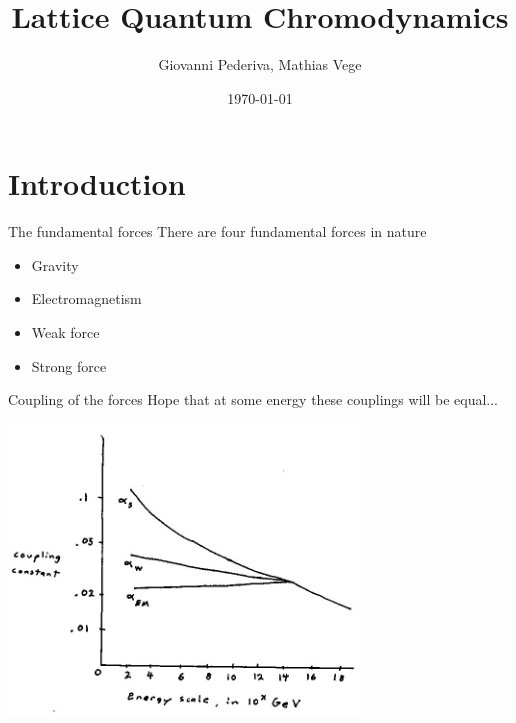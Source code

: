 \documentclass[10pt]{beamer}
\title{Lattice Quantum Chromodynamics}
\date{\today}
\author{Giovanni Pederiva, Mathias Vege}
\institute{University of Oslo}
\begin{document}
\maketitle


\section{Introduction}

\begin{frame}{The fundamental forces}
	There are four fundamental forces in nature
	\begin{itemize}
		\item Gravity
		\item Electromagnetism
		\item Weak force
		\item Strong force
	\end{itemize}
\end{frame}

\begin{frame}{Coupling of the forces}
	Hope that at some energy these couplings will be equal...
	\begin{center}
	\includegraphics[width=0.7\textwidth]{figures/couplings.jpg}
	\end{center}
\end{frame}
\end{document}
